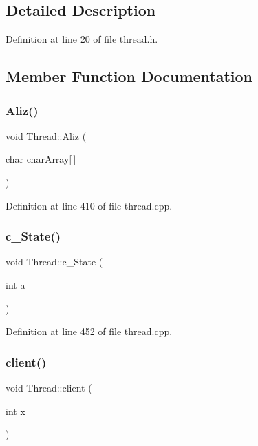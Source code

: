 \subsection{Detailed Description}


Definition at line 20 of file thread.\+h.



\subsection{Member Function Documentation}
\mbox{\label{class_thread_a49dfdb57b8e29858c9fa3f33c5db327d}} 
\subsubsection{\texorpdfstring{Aliz()}{Aliz()}}
{\footnotesize\ttfamily void Thread\+::\+Aliz (\begin{DoxyParamCaption}\item[{char}]{char\+Array\mbox{[}$\,$\mbox{]} }\end{DoxyParamCaption})\hspace{0.3cm}{\ttfamily [private]}}



Definition at line 410 of file thread.\+cpp.

\mbox{\label{class_thread_a9277677620d5ddb091b7b2c1bf06d3de}} 
\subsubsection{\texorpdfstring{c\+\_\+\+State()}{c\_State()}}
{\footnotesize\ttfamily void Thread\+::c\+\_\+\+State (\begin{DoxyParamCaption}\item[{int}]{a }\end{DoxyParamCaption})}



Definition at line 452 of file thread.\+cpp.

\mbox{\label{class_thread_ac4eb870d2e959ed19546eb2776ccd4f0}} 
\subsubsection{\texorpdfstring{client()}{client()}}
{\footnotesize\ttfamily void Thread\+::client (\begin{DoxyParamCaption}\item[{int}]{x }\end{DoxyParamCaption})}



